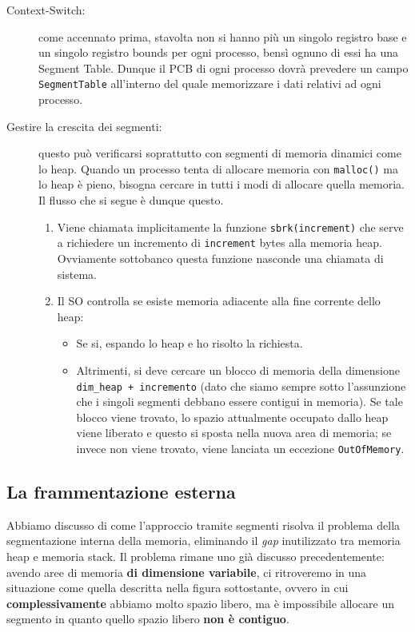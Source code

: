 \documentclass[12pt]{report}
\begin{document}
	\begin{description}
		\item [Context-Switch:] come accennato prima, stavolta non si hanno più un singolo registro base e un singolo registro bounds per ogni processo, bensì ognuno di essi ha una Segment Table. Dunque il PCB di ogni processo dovrà prevedere un campo \texttt{SegmentTable} all'interno del quale memorizzare i dati relativi ad ogni processo.
		
		\item[Gestire la crescita dei segmenti:] questo può verificarsi soprattutto con segmenti di memoria dinamici come lo heap. Quando un processo tenta di allocare memoria con \texttt{malloc()} ma lo heap è pieno, bisogna cercare in tutti i modi di allocare quella memoria. Il flusso che si segue è dunque questo.
		\begin{enumerate}
			\item Viene chiamata implicitamente la funzione \texttt{sbrk(increment)} che serve a richiedere un incremento di \texttt{increment} bytes alla memoria heap. Ovviamente sottobanco questa funzione nasconde una chiamata di sistema.
			
			\item Il SO controlla se esiste memoria adiacente alla fine corrente dello heap:
			\begin{itemize}
				\item Se si, espando lo heap e ho risolto la richiesta.
				
				\item Altrimenti, si deve cercare un blocco di memoria della dimensione \texttt{dim\_heap + incremento} (dato che siamo sempre sotto l'assunzione che i singoli segmenti debbano essere contigui in memoria). Se tale blocco viene trovato, lo spazio attualmente occupato dallo heap viene liberato e questo si sposta nella nuova area di memoria; se invece non viene trovato, viene lanciata un eccezione \texttt{OutOfMemory}.
			\end{itemize}
		\end{enumerate}
	\end{description}
	
	\subsection{La frammentazione esterna}
	Abbiamo discusso di come l'approccio tramite segmenti risolva il problema della segmentazione interna della memoria, eliminando il \textit{gap} inutilizzato tra memoria heap e memoria stack. Il problema rimane uno già discusso precedentemente: avendo aree di memoria \textbf{di dimensione variabile}, ci ritroveremo in una situazione come quella descritta nella figura sottostante, ovvero in cui \textbf{complessivamente} abbiamo molto spazio libero, ma è impossibile allocare un segmento in quanto quello spazio libero \textbf{non è contiguo}.
	
\end{document}
